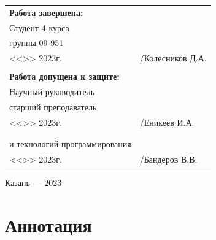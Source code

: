 \documentclass[a4paper,article]{article}
\begin{document}
\begin{sloppypar}
\begin{titlepage}
        \begin{xltabular}{\textwidth} {
                >{\hsize} X
                >{\hsize} X }
            \bfseries{Работа завершена:} & \\
            Студент 4 курса & \\
            группы 09-951 & \\
            <<\underline{\hspace{1cm}}>>\underline{\hspace{3cm}} 2023г. & \underline{\hspace{3cm}}/Колесников Д.А. \\
            & \\
            \bfseries{Работа допущена к защите:} & \\
            Научный руководитель & \\
            старший преподаватель & \\
            <<\underline{\hspace{1cm}}>>\underline{\hspace{3cm}} 2023г. & \underline{\hspace{3cm}}/Еникеев И.А. \\
            & \\
             \\
            и технологий программирования & \\
            <<\underline{\hspace{1cm}}>>\underline{\hspace{3cm}} 2023г. & \underline{\hspace{3cm}}/Бандеров В.В. \\
        \end{xltabular}

        \vspace{0mm}

        \begin{center}
            Казань — 2023
        \end{center}
    \end{titlepage}

    \newpage

    \setcounter{page}{2}

    \tableofcontents

    \newpage

    \section*{Аннотация}


\end{sloppypar}
\end{document}
